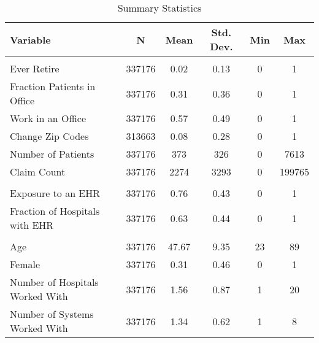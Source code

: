 


\begin{table}[ht]
\caption{Summary Statistics}
\centering
\begin{tabular}[t]{lccccc}
\toprule
Variable & N & Mean & Std. Dev. & Min & Max\\
\midrule
\addlinespace[0.3em]
\multicolumn{6}{l}{\textbf{Outcomes}}\\
\hspace{1em}Ever Retire & 337176 & 0.02 & 0.13 & 0 & 1\\
\hspace{1em}Fraction Patients in Office & 337176 & 0.31 & 0.36 & 0 & 1\\
\hspace{1em}Work in an Office & 337176 & 0.57 & 0.49 & 0 & 1\\
\hspace{1em}Change Zip Codes & 313663 & 0.08 & 0.28 & 0 & 1\\
\hspace{1em}Number of Patients & 337176 & 373 & 326 & 0 & 7613\\
\hspace{1em}Claim Count & 337176 & 2274 & 3293 & 0 & 199765\\
\addlinespace[0.3em]
\multicolumn{6}{l}{\textbf{Treatment}}\\
\hspace{1em}Exposure to an EHR & 337176 & 0.76 & 0.43 & 0 & 1\\
\hspace{1em}Fraction of Hospitals with EHR & 337176 & 0.63 & 0.44 & 0 & 1\\
\addlinespace[0.3em]
\multicolumn{6}{l}{\textbf{Characteristics}}\\
\hspace{1em}Age & 337176 & 47.67 & 9.35 & 23 & 89\\
\hspace{1em}Female & 337176 & 0.31 & 0.46 & 0 & 1\\
\hspace{1em}Number of Hospitals Worked With & 337176 & 1.56 & 0.87 & 1 & 20\\
\hspace{1em}Number of Systems Worked With & 337176 & 1.34 & 0.62 & 1 & 8\\
\bottomrule
\end{tabular}
\label{tab:sumstats1}
\end{table}